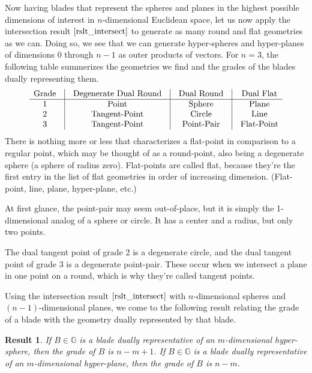 \documentclass[12pt]{article}
\newcommand{\G}{\mathbb{G}}
\newtheorem{result}{Result}[section]
\begin{document}
Now having blades that represent the spheres and planes in the highest possible
dimensions of interest in $n$-dimensional Euclidean space, let us now apply
the intersection result $\eqref{rslt_intersect}$ to generate as many round
and flat geometries as we can.  Doing so, we see that we can generate
hyper-spheres and hyper-planes of dimensions $0$ through $n-1$ as
outer products of vectors.  For $n=3$, the following table summerizes
the geometries we find and the grades of the blades dually representing them.
\begin{equation*}
\begin{array}{ccccccc}
\mbox{Grade} & \vline & \mbox{Degenerate Dual Round} & \vline & \mbox{Dual Round} & \vline & \mbox{Dual Flat} \\
\hline
1 & \vline & \mbox{Point} & \vline & \mbox{Sphere} & \vline & \mbox{Plane} \\
2 & \vline & \mbox{Tangent-Point} & \vline & \mbox{Circle} & \vline & \mbox{Line} \\
3 & \vline & \mbox{Tangent-Point} & \vline & \mbox{Point-Pair} & \vline & \mbox{Flat-Point}
\end{array}
\end{equation*}
There is nothing more or less that characterizes a flat-point in comparison
to a regular point, which may be thought of as a round-point, also being
a degenerate sphere (a sphere of radius zero).  Flat-points are called flat,
because they're the first entry in the list of flat geometries in order of
increasing dimension.  (Flat-point, line, plane, hyper-plane, etc.)

At first glance, the point-pair may seem out-of-place, but it is simply
the 1-dimensional analog of a sphere or circle.  It has a center and
a radius, but only two points.

The dual tangent point of grade 2 is a degenerate
circle, and the dual tangent point of grade 3 is a degenerate point-pair.
These occur when we intersect a plane in one point on a round,
which is why they're called tangent points.

Using the intersection result $\eqref{rslt_intersect}$ with $n$-dimensional spheres
and $(n-1)$-dimensional planes, we come to the following result relating the grade of a blade
with the geometry dually represented by that blade.
\begin{result}\label{rslt_intersect_grades}
If $B\in\G$ is a blade dually representative of an $m$-dimensional
hyper-sphere, then the grade of $B$ is $n-m+1$.  If $B\in\G$ is a blade
dually representative of an $m$-dimensional hyper-plane, then the
grade of $B$ is $n-m$.
\end{result}
\end{document}
